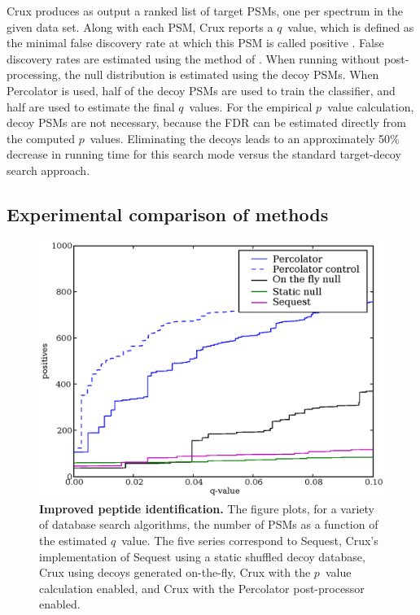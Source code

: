 \documentclass[12pt]{article}
\begin{document}
Crux produces as output a ranked list of target PSMs, one per spectrum
in the given data set.  Along with each PSM, Crux reports a $q$~value,
which is defined as the minimal false discovery rate at which this PSM
is called positive \cite{storey:statistical, kall:assigning}.  False
discovery rates are estimated using the method of
\cite{benjamini:controlling}.  When running without post-processing,
the null distribution is estimated using the decoy PSMs.  When
Percolator is used, half of the decoy PSMs are used to train the
classifier, and half are used to estimate the final $q$~values.  For
the empirical $p$~value calculation, decoy PSMs are not necessary,
because the FDR can be estimated directly from the computed
$p$~values.  Eliminating the decoys leads to an approximately 50\%
decrease in running time for this search mode versus the standard
target-decoy search approach.

\subsection{Experimental comparison of methods}
\label{section:experimental}

\begin{figure}
\centering
\includegraphics[width=5in]{./Images/q-value.eps}
\caption{{\bf Improved peptide identification.}  The figure plots, for
  a variety of database search algorithms, the number of PSMs as a
  function of the estimated $q$~value.  The five series correspond to
  {\sc Sequest}, Crux's implementation of {\sc Sequest} using a static
  shuffled decoy database, Crux using decoys generated on-the-fly,
  Crux with the $p$~value calculation enabled, and Crux with the
  Percolator post-processor enabled.
  \label{figure:pq-plot}}
\end{figure}
\end{document}
